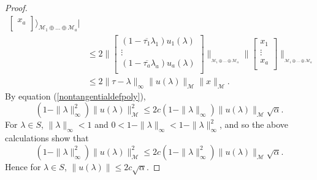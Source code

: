 \documentclass[11pt, reqno]{amsart}
\newcommand\1{\boldsymbol {1}}
\numberwithin{equation}{section}
\begin{document}
\begin{proof}
\begin{align*}
\begin{bmatrix}
    x_{a}  \\
\end{bmatrix}\Bigg\rangle_{\mathcal{M}_{1}\oplus\hdots\oplus\mathcal{M}_{a}}\Bigg\rvert\\
&\leq 2\Bigg\|\begin{bmatrix}
	(1-\overline{\tau_{1}}\lambda_{1})u_{1}(\lambda) \\
    \vdots \\
    (1-\overline{\tau_{a}}\lambda_{a})u_{a}(\lambda)  \\
\end{bmatrix}\Bigg\|_{_{\mathcal{M}_{1}\oplus\hdots\oplus\mathcal{M}_{a}}}\Bigg\|\begin{bmatrix}
	x_{1} \\
    \vdots \\
    x_{a} \\
\end{bmatrix}\Bigg\|_{_{\mathcal{M}_{1}\oplus\hdots\oplus\mathcal{M}_{a}}}\\
&\leq 2\|\tau-\lambda\|_{\infty}\|u(\lambda)\|_{\mathcal{M}}\|x\|_{\mathcal{M}}.
\end{align*}
By equation (\ref{nontangentialdefpoly}),
$$(1-\|\lambda\|_{\infty}^{2})\|u(\lambda)\|_{\mathcal{M}}^{2}\leq 2c(1-\|\lambda\|_{\infty})\|u(\lambda)\|_{\mathcal{M}}\sqrt{\alpha}.$$
For $\lambda\in S$, $\|\lambda\|_{\infty} < 1$ and  $ 0< 1-\|\lambda\|_{\infty} < 1-\|\lambda\|_{\infty}^{2}$, and so the above calculations show that
$$(1-\|\lambda\|_{\infty}^{2})\|u(\lambda)\|_{\mathcal{M}}^{2}\leq 2c(1-\|\lambda\|_{\infty}^{2})\|u(\lambda)\|_{\mathcal{M}}\sqrt{\alpha}.$$
Hence for $\lambda\in S$, $\|u(\lambda)\|\leq 2c\sqrt{\alpha}$.\end{proof}
\end{document}
